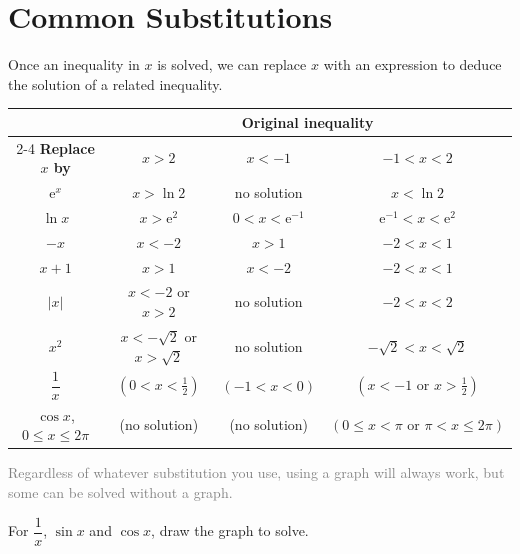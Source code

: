 \documentclass[a4paper,11pt,oneside]{book}
\providecommand{\e}{\mathrm{e}}
\providecommand{\sidenote}[1]{{\small\textcolor{gray}{#1}}}
\begin{document}
\section{Common Substitutions}
Once an inequality in $x$ is solved, we can replace $x$ with an expression to deduce the solution of a related inequality.\par\smallskip
\begin{center}\renewcommand{\arraystretch}{1.5}
\begin{tabular}{|c|c|c|c|}\hline
 & \multicolumn{3}{c|}{\textbf{Original inequality}}\\\cline{2-4}
\textbf{Replace $x$ by} & $x>2$ & $x<-1$ & $-1<x<2$\\\Xhline{2pt}
$\e^{x}$ & $x>\ln2$ & no solution & $x<\ln2$\\\hline
$\ln x$ & $x>\e^{2}$ & $0<x<\e^{-1}$ & $\e^{-1}<x<\e^{2}$\\\hline
$-x$ & $x<-2$ & $x>1$ & $-2<x<1$\\\hline
$x+1$ & $x>1$ & $x<-2$ & $-2<x<1$\\\hline
$|x|$ & $x<-2$ or $x>2$ & no solution & $-2<x<2$\\\hline
$x^{2}$ & $x<-\sqrt2$ or $x>\sqrt2$ & no solution & $-\sqrt2<x<\sqrt2$\\\hline
$\dfrac1x$ & $\left(0<x<\tfrac12\right)$ & $(-1<x<0)$ & $\left(x<-1\text{ or }x>\tfrac12\right)$\\\hline
$\cos x$, $0\leqslant x\leqslant2\pi$ & (no solution) & (no solution) & $(0\leqslant x<\pi\text{ or }\pi<x\leqslant2\pi)$\\\hline
\end{tabular}\end{center}
\sidenote{Regardless of whatever substitution you use, using a graph will always work, but some can be solved without a graph.}\par
For $\dfrac1x$, $\sin x$ and $\cos x$, draw the graph to solve.\par\medskip
\end{document}
